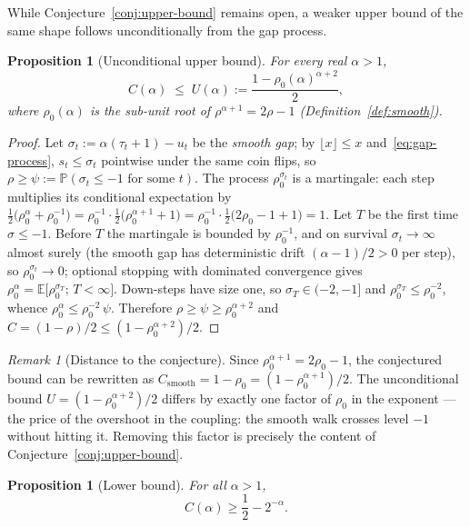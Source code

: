 \documentclass[11pt]{article}
\newtheorem{proposition}[theorem]{Proposition}
\theoremstyle{definition}
\theoremstyle{remark}
\newtheorem{remark}[theorem]{Remark}
\newcommand{\floor}[1]{\lfloor #1 \rfloor}
\begin{document}
While Conjecture~\ref{conj:upper-bound} remains open, a weaker
upper bound of the same shape follows unconditionally from the gap
process.

\begin{proposition}[Unconditional upper bound]%
\label{prop:upper-unconditional}
For every real $\alpha > 1$,
\[
C(\alpha) \;\leq\; U(\alpha) :=
\frac{1 - \rho_0(\alpha)^{\alpha+2}}{2},
\]
where $\rho_0(\alpha)$ is the sub-unit root of
$\rho^{\alpha+1} = 2\rho - 1$ (Definition~\ref{def:smooth}).
\end{proposition}

\begin{proof}
Let $\sigma_t := \alpha(\tau_t + 1) - u_t$ be the \emph{smooth gap};
by $\floor{x} \leq x$ and~\eqref{eq:gap-process}, $s_t \leq \sigma_t$
pointwise under the same coin flips, so
$\rho \geq \psi := \mathbb{P}(\sigma_t \leq -1 \text{ for some } t)$.
The process $\rho_0^{\sigma_t}$ is a martingale: each step
multiplies its conditional expectation by
$\tfrac{1}{2}\bigl(\rho_0^{\alpha} + \rho_0^{-1}\bigr)
= \rho_0^{-1} \cdot \tfrac{1}{2}\bigl(\rho_0^{\alpha+1} + 1\bigr)
= \rho_0^{-1} \cdot \tfrac{1}{2}\bigl(2\rho_0 - 1 + 1\bigr) = 1$.
Let $T$ be the first time $\sigma \leq -1$.
Before $T$ the martingale is bounded by $\rho_0^{-1}$, and on
survival $\sigma_t \to \infty$ almost surely (the smooth gap has
deterministic drift $(\alpha-1)/2 > 0$ per step), so
$\rho_0^{\sigma_t} \to 0$; optional stopping with dominated
convergence gives
$\rho_0^{\alpha} = \mathbb{E}\bigl[\rho_0^{\sigma_T};\, T < \infty
\bigr]$.
Down-steps have size one, so $\sigma_T \in (-2, -1]$ and
$\rho_0^{\sigma_T} \leq \rho_0^{-2}$, whence
$\rho_0^{\alpha} \leq \rho_0^{-2}\,\psi$.
Therefore $\rho \geq \psi \geq \rho_0^{\alpha+2}$ and
$C = (1 - \rho)/2 \leq (1 - \rho_0^{\alpha+2})/2$.
\end{proof}

\begin{remark}[Distance to the conjecture]
Since $\rho_0^{\alpha+1} = 2\rho_0 - 1$, the conjectured bound can
be rewritten as
$C_{\mathrm{smooth}} = 1 - \rho_0 = (1 - \rho_0^{\alpha+1})/2$.
The unconditional bound $U = (1 - \rho_0^{\alpha+2})/2$ differs by
exactly one factor of $\rho_0$ in the exponent --- the price of the
overshoot in the coupling: the smooth walk crosses level $-1$
without hitting it.
Removing this factor is precisely the content of
Conjecture~\ref{conj:upper-bound}.
\end{remark}

\begin{proposition}[Lower bound]\label{prop:lower-bound}
For all $\alpha > 1$,
\[
C(\alpha) \geq \frac{1}{2} - 2^{-\alpha}.
\]
\end{proposition}
\end{document}
